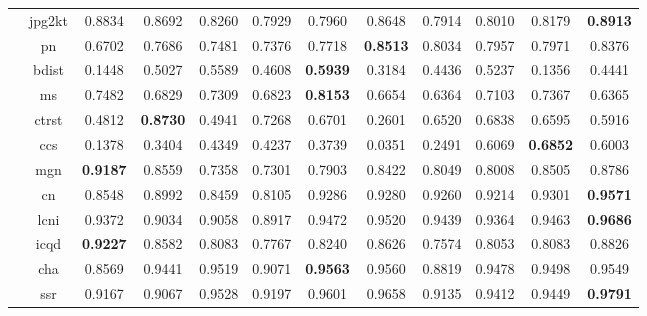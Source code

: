 \documentclass[11pt,a4paper]{article}
\begin{document}
\begin{table}[!htb]
\begin{scriptsize}
{\begin{threeparttable}
\begin{tabular}{*{12}{c}}
& jpg2kt & 0.8834 & 0.8692 & \cellcolor{green!25}0.8260 & \cellcolor{green!25}0.7929 & \cellcolor{green!25}0.7960 & 0.8648 & \cellcolor{green!25}0.7914 & \cellcolor{green!25}0.8010 & \cellcolor{green!25}0.8179 & \textbf{0.8913}\\
& pn & \cellcolor{green!25}0.6702 & 0.7686 & 0.7481 & \cellcolor{green!25}0.7376 & 0.7718 & \textbf{0.8513} & 0.8034 & 0.7957 & 0.7971 & 0.8376\\
& bdist & \cellcolor{green!25}0.1448 & 0.5027 & 0.5589 & 0.4608 & \textbf{0.5939} & 0.3184 & 0.4436 & 0.5237 & \cellcolor{green!25}0.1356 & 0.4441\\
& ms & 0.7482 & 0.6829 & 0.7309 & 0.6823 & \cellcolor{red!25}\textbf{0.8153} & 0.6654 & 0.6364 & 0.7103 & 0.7367 & 0.6365\\
& ctrst & 0.4812 & \cellcolor{red!25}\textbf{0.8730} & 0.4941 & 0.7268 & 0.6701 & \cellcolor{green!25}0.2601 & 0.6520 & 0.6838 & 0.6595 & 0.5916\\
& ccs & \cellcolor{green!25}0.1378 & \cellcolor{green!25}0.3404 & 0.4349 & 0.4237 & \cellcolor{green!25}0.3739 & \cellcolor{green!25}0.0351 & \cellcolor{green!25}0.2491 & 0.6069 & \textbf{0.6852} & 0.6003\\
& mgn & \textbf{0.9187} & 0.8559 & \cellcolor{green!25}0.7358 & \cellcolor{green!25}0.7301 & \cellcolor{green!25}0.7903 & 0.8422 & \cellcolor{green!25}0.8049 & \cellcolor{green!25}0.8008 & 0.8505 & 0.8786\\
& cn & \cellcolor{green!25}0.8548 & \cellcolor{green!25}0.8992 & \cellcolor{green!25}0.8459 & \cellcolor{green!25}0.8105 & \cellcolor{green!25}0.9286 & \cellcolor{green!25}0.9280 & \cellcolor{green!25}0.9260 & \cellcolor{green!25}0.9214 & \cellcolor{green!25}0.9301 & \textbf{0.9571}\\
& lcni & \cellcolor{green!25}0.9372 & \cellcolor{green!25}0.9034 & \cellcolor{green!25}0.9058 & \cellcolor{green!25}0.8917 & \cellcolor{green!25}0.9472 & 0.9520 & \cellcolor{green!25}0.9439 & \cellcolor{green!25}0.9364 & \cellcolor{green!25}0.9463 & \textbf{0.9686}\\
& icqd & \textbf{0.9227} & 0.8582 & \cellcolor{green!25}0.8083 & \cellcolor{green!25}0.7767 & 0.8240 & 0.8626 & \cellcolor{green!25}0.7574 & \cellcolor{green!25}0.8053 & \cellcolor{green!25}0.8083 & 0.8826\\
& cha & \cellcolor{green!25}0.8569 & 0.9441 & 0.9519 & \cellcolor{green!25}0.9071 & \textbf{0.9563} & 0.9560 & \cellcolor{green!25}0.8819 & 0.9478 & 0.9498 & 0.9549\\
& ssr & \cellcolor{green!25}0.9167 & \cellcolor{green!25}0.9067 & \cellcolor{green!25}0.9528 & \cellcolor{green!25}0.9197 & \cellcolor{green!25}0.9601 & 0.9658 & \cellcolor{green!25}0.9135 & \cellcolor{green!25}0.9412 & \cellcolor{green!25}0.9449 & \textbf{0.9791}\\

\end{tabular}
\end{threeparttable}}
\end{scriptsize}
\end{table}
\end{document}

